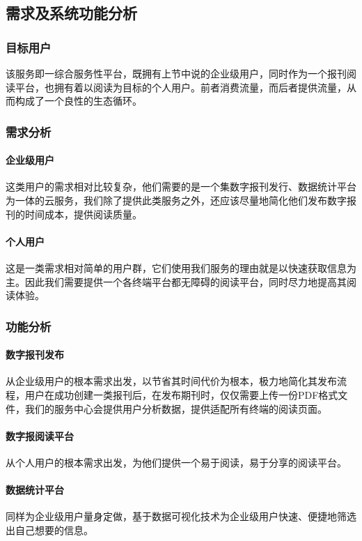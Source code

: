 
\subsection{需求及系统功能分析}
\subsubsection{目标用户}
该服务即一综合服务性平台，既拥有上节中说的企业级用户，同时作为一个报刊阅读平台，也拥有着以阅读为目标的个人用户。前者消费流量，而后者提供流量，从而构成了一个良性的生态循环。

\subsubsection{需求分析}
\paragraph{企业级用户}
这类用户的需求相对比较复杂，他们需要的是一个集数字报刊发行、数据统计平台为一体的云服务，我们除了提供此类服务之外，还应该尽量地简化他们发布数字报刊的时间成本，提供阅读质量。

\paragraph{个人用户}
这是一类需求相对简单的用户群，它们使用我们服务的理由就是以快速获取信息为主。因此我们需要提供一个各终端平台都无障碍的阅读平台，同时尽力地提高其阅读体验。

\subsubsection{功能分析}
\paragraph{数字报刊发布}
从企业级用户的根本需求出发，以节省其时间代价为根本，极力地简化其发布流程，用户在成功创建一类报刊后，在发布期刊时，仅仅需要上传一份PDF格式文件，我们的服务中心会提供用户分析数据，提供适配所有终端的阅读页面。

\paragraph{数字报阅读平台}
从个人用户的根本需求出发，为他们提供一个易于阅读，易于分享的阅读平台。

\paragraph{数据统计平台}
同样为企业级用户量身定做，基于数据可视化技术为企业级用户快速、便捷地筛选出自己想要的信息。

